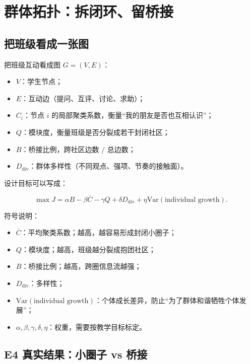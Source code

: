 \documentclass[UTF8,a4paper,11pt]{ctexart}
\begin{document}
\section{群体拓扑：拆闭环、留桥接}

\subsection{把班级看成一张图}

把班级互动看成图 $G=(V,E)$：

\begin{itemize}[leftmargin=2em]
\item $V$：学生节点；
\item $E$：互动边（提问、互评、讨论、求助）；
\item $C_i$：节点 $i$ 的局部聚类系数，衡量“我的朋友是否也互相认识”；
\item $Q$：模块度，衡量班级是否分裂成若干封闭社区；
\item $B$：桥接比例，跨社区边数 $/$ 总边数；
\item $D_{\text{div}}$：群体多样性（不同观点、强项、节奏的接触面）。
\end{itemize}

设计目标可以写成：

\begin{equation}
\max J=
\alpha B
-\beta \overline{C}
-\gamma Q
+\delta D_{\text{div}}
+\eta \mathrm{Var}(\text{individual growth}).
\end{equation}

符号说明：

\begin{itemize}[leftmargin=2em]
\item $\overline{C}$：平均聚类系数；越高，越容易形成封闭小圈子；
\item $Q$：模块度；越高，班级越分裂成抱团社区；
\item $B$：桥接比例；越高，跨圈信息流越强；
\item $D_{\text{div}}$：多样性；
\item $\mathrm{Var}(\text{individual growth})$：个体成长差异，防止“为了群体和谐牺牲个体发展”；
\item $\alpha,\beta,\gamma,\delta,\eta$：权重，需要按教学目标标定。
\end{itemize}

\subsection{E4 真实结果：小圈子 vs 桥接}
\end{document}
